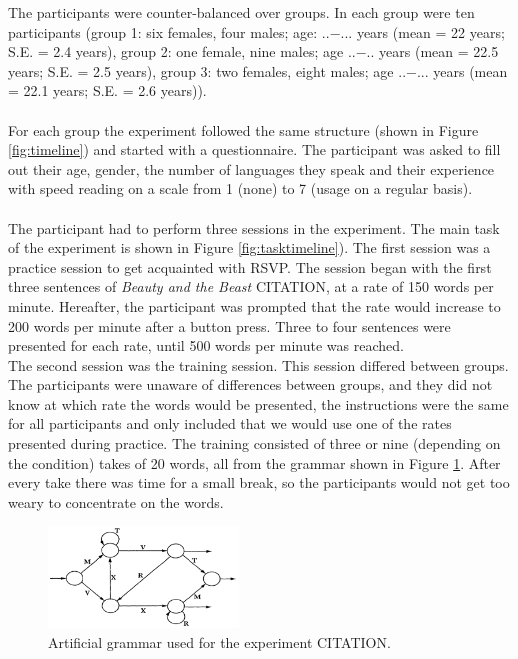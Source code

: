 \noindent The participants were counter-balanced over groups. In each group were ten participants (group 1: six females, four males; age: ..$-$... years (mean = 22 years; S.E. = 2.4 years), group 2: one female, nine males; age ..$-$.. years (mean = 22.5 years; S.E. = 2.5 years), group 3: two females, eight males; age ..$-$... years (mean = 22.1 years; S.E. = 2.6 years)).\\
\\
For each group the experiment followed the same structure (shown in Figure \ref{fig:timeline}) and started with a questionnaire. The participant was asked to fill out their age, gender, the number of languages they speak and their experience with speed reading on a scale from 1 (none) to 7 (usage on a regular basis). \\
\\
The participant had to perform three sessions in the experiment. The main task of the experiment is shown in Figure \ref{fig:tasktimeline}). The first session was a practice session to get acquainted with RSVP. The session began with the first three sentences of \textit{Beauty and the Beast} CITATION, at a rate of 150 words per minute. Hereafter, the participant was prompted that the rate would increase to 200 words per minute after a button press. Three to four sentences were presented for each rate, until 500 words per minute was reached.\\
The second session was the training session. This session differed between groups. The participants were unaware of differences between groups, and they did not know at which rate the words would be presented, the instructions were the same for all participants and only included that we would use one of the rates presented during practice. The training consisted of three or nine (depending on the condition) takes of 20 words, all from the grammar shown in Figure \ref{fig:grammar}. After every take there was time for a small break, so the participants would not get too weary to concentrate on the words.

\begin{figure}[h]
	\centering
	\includegraphics[width=0.45\textwidth]{media/grammar}
	\caption{Artificial grammar used for the experiment CITATION.}
	\label{fig:grammar}
\end{figure}

